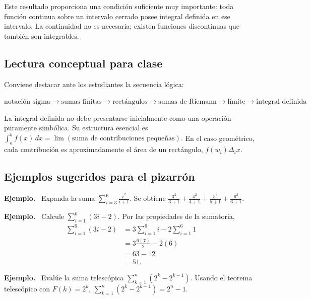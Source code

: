 \documentclass[12pt]{article}
\newenvironment{Ejem}
{\par\medskip\noindent\textbf{Ejemplo.}\ }
{\par\medskip}
\begin{document}
Este resultado proporciona una condición suficiente muy importante: toda
función continua sobre un intervalo cerrado posee integral definida en ese
intervalo. La continuidad no es necesaria; existen funciones discontinuas que
también son integrables.
\subsection*{Lectura conceptual para clase}
Conviene destacar ante los estudiantes la secuencia lógica:

$
\boxed{
\text{notación sigma}
\longrightarrow
\text{sumas finitas}
\longrightarrow
\text{rectángulos}
\longrightarrow
\text{sumas de Riemann}
\longrightarrow
\text{límite}
\longrightarrow
\text{integral definida}
}
$

La integral definida no debe presentarse inicialmente como una operación
puramente simbólica. Su estructura esencial es
$
\int_a^b f(x)\,dx
=
\lim
\left(
\text{suma de contribuciones pequeñas}
\right).
$
En el caso geométrico, cada contribución es aproximadamente el área de un
rectángulo,
$
f(w_i)\Delta_i x.
$
\subsection*{Ejemplos sugeridos para el pizarrón}
\begin{Ejem}
Expanda la suma
$
\sum_{i=3}^{6}\frac{i^2}{i+1}.
$
Se obtiene
$
\frac{3^2}{3+1}
+
\frac{4^2}{4+1}
+
\frac{5^2}{5+1}
+
\frac{6^2}{6+1}.
$
\end{Ejem}

\begin{Ejem}
Calcule
$
\sum_{i=1}^{6}(3i-2).
$
Por las propiedades de la sumatoria,
\begin{align*}
\sum_{i=1}^{6}(3i-2)
&=
3\sum_{i=1}^{6}i
-
2\sum_{i=1}^{6}1\\
&=
3\frac{6(7)}{2}-2(6)\\
&=
63-12\\
&=
51.
\end{align*}
\end{Ejem}

\begin{Ejem}
Evalúe la suma telescópica
$
\sum_{k=1}^{n}\left(2^k-2^{k-1}\right).
$
Usando el teorema telescópico con $F(k)=2^k$,
$
\sum_{k=1}^{n}\left(2^k-2^{k-1}\right)
=
2^n-1.
$
\end{Ejem}
\end{document}
